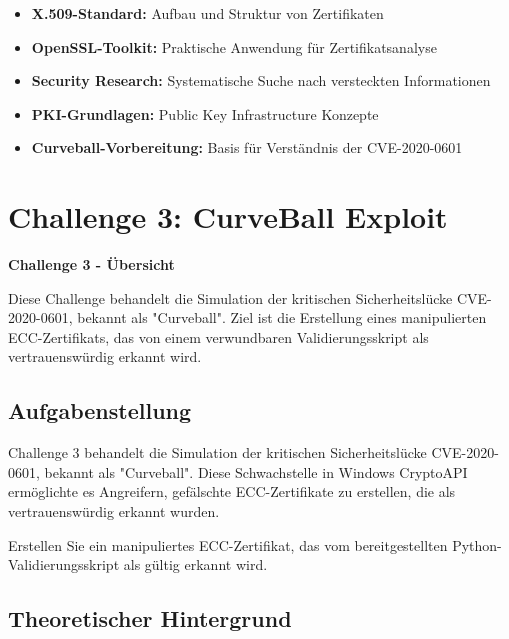 \documentclass{article}
\begin{document}
\begin{itemize}
    \item \textbf{X.509-Standard:} Aufbau und Struktur von Zertifikaten
    \item \textbf{OpenSSL-Toolkit:} Praktische Anwendung für Zertifikatsanalyse
    \item \textbf{Security Research:} Systematische Suche nach versteckten Informationen
    \item \textbf{PKI-Grundlagen:} Public Key Infrastructure Konzepte
    \item \textbf{Curveball-Vorbereitung:} Basis für Verständnis der CVE-2020-0601
\end{itemize}

\clearpage

\section{Challenge 3: CurveBall Exploit}

\begin{solutionbox}
\textbf{Challenge 3 - Übersicht}

Diese Challenge behandelt die Simulation der kritischen Sicherheitslücke CVE-2020-0601, bekannt als "Curveball". Ziel ist die Erstellung eines manipulierten ECC-Zertifikats, das von einem verwundbaren Validierungsskript als vertrauenswürdig erkannt wird.
\end{solutionbox}

\subsection{Aufgabenstellung}

Challenge 3 behandelt die Simulation der kritischen Sicherheitslücke CVE-2020-0601, bekannt als "Curveball". Diese Schwachstelle in Windows CryptoAPI ermöglichte es Angreifern, gefälschte ECC-Zertifikate zu erstellen, die als vertrauenswürdig erkannt wurden.

\begin{tcolorbox}[colback=red!10,colframe=red,title=\textbf{Ziel}]
Erstellen Sie ein manipuliertes ECC-Zertifikat, das vom bereitgestellten Python-Validierungsskript als gültig erkannt wird.
\end{tcolorbox}

\subsection{Theoretischer Hintergrund}
\end{document}
